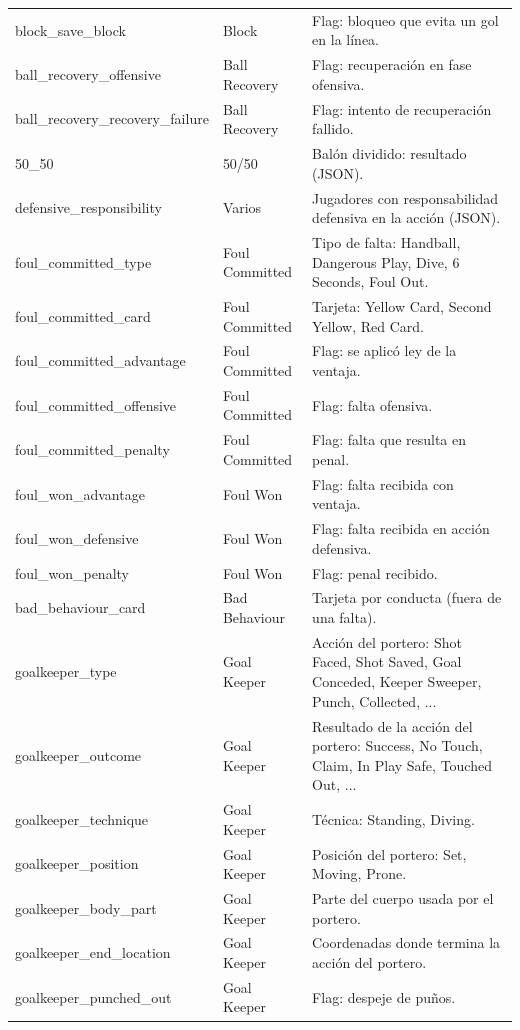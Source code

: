 {\begin{longtable}{p{4.3cm}p{2.2cm}p{8.8cm}}
block\_save\_block & Block & Flag: bloqueo que evita un gol en la línea. \\
ball\_recovery\_offensive & Ball Recovery & Flag: recuperación en fase ofensiva. \\
ball\_recovery\_recovery\_failure & Ball Recovery & Flag: intento de recuperación fallido. \\
50\_50 & 50/50 & Balón dividido: resultado (JSON). \\
defensive\_responsibility & Varios & Jugadores con responsabilidad defensiva en la acción (JSON). \\
foul\_committed\_type & Foul Committed & Tipo de falta: Handball, Dangerous Play, Dive, 6 Seconds, Foul Out. \\
foul\_committed\_card & Foul Committed & Tarjeta: Yellow Card, Second Yellow, Red Card. \\
foul\_committed\_advantage & Foul Committed & Flag: se aplicó ley de la ventaja. \\
foul\_committed\_offensive & Foul Committed & Flag: falta ofensiva. \\
foul\_committed\_penalty & Foul Committed & Flag: falta que resulta en penal. \\
foul\_won\_advantage & Foul Won & Flag: falta recibida con ventaja. \\
foul\_won\_defensive & Foul Won & Flag: falta recibida en acción defensiva. \\
foul\_won\_penalty & Foul Won & Flag: penal recibido. \\
bad\_behaviour\_card & Bad Behaviour & Tarjeta por conducta (fuera de una falta). \\
goalkeeper\_type & Goal Keeper & Acción del portero: Shot Faced, Shot Saved, Goal Conceded, Keeper Sweeper, Punch, Collected, ... \\
goalkeeper\_outcome & Goal Keeper & Resultado de la acción del portero: Success, No Touch, Claim, In Play Safe, Touched Out, ... \\
goalkeeper\_technique & Goal Keeper & Técnica: Standing, Diving. \\
goalkeeper\_position & Goal Keeper & Posición del portero: Set, Moving, Prone. \\
goalkeeper\_body\_part & Goal Keeper & Parte del cuerpo usada por el portero. \\
goalkeeper\_end\_location & Goal Keeper & Coordenadas donde termina la acción del portero. \\
goalkeeper\_punched\_out & Goal Keeper & Flag: despeje de puños. \\

\end{longtable}}
